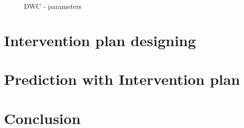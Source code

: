   \begin{figure}[!h]
  \centering
  \caption{DWC - parameters}
  \label{fig: DWC para}
  \end{figure}


\section{Intervention plan designing}

\section{Prediction with Intervention plan}

\section{Conclusion}


